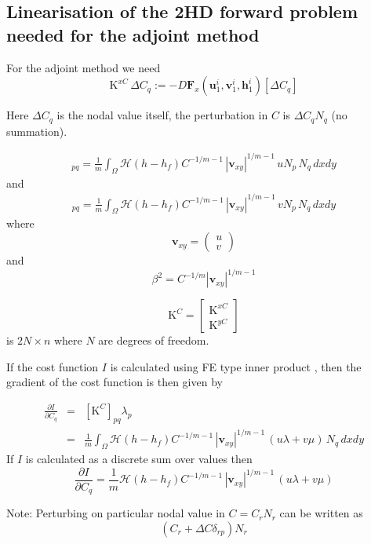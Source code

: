 \documentclass[10pt,a4paper]{book}
\newcommand{\He}{\mathcal{H}}
\newcommand{\p}{\partial}
\begin{document}
\subsection{Linearisation of the 2HD forward problem needed for the adjoint method}

For the adjoint method we need	
\[
\mathrm{K}^{xC} \, \Delta C_q:=-D \bm{F}_x(\bm{u}_1^{i},\bm{v}_1^i,\bm{h}_1^i)[\Delta C_q]
\]

Here $\Delta C_q$ is the nodal value itself, the perturbation in $C$ is $\Delta C_q N_q$ (no summation).

\begin{eqnarray}
[\mathrm{K}^{xC}]_{pq}=\frac{1}{m} \int_{\Omega}  \He(h-h_f)  C^{-1/m-1}  \, | \bm{v}_{xy}|^{1/m-1} \,  u N_p \, N_q \, dx dy 
\end{eqnarray}
and
\begin{eqnarray}
[\mathrm{K}^{yC}]_{pq}=\frac{1}{m} \int_{\Omega}  \He(h-h_f)  C^{-1/m-1}  \, | \bm{v}_{xy}|^{1/m-1} \,  v N_p \, N_q \, dx dy 
\end{eqnarray}
where
\[
\bm{v}_{xy}= \left ( \begin{array}{c} u \\ v \end{array} \right )
\]
and
\[
\beta^2=C^{-1/m} | \bm{v}_{xy}|^{1/m-1} 
\]

\[
\mathrm{K}^{C}=\left [ \begin{array}{c}  \mathrm{K}^{xC} \\ \mathrm{K}^{yC} \end{array} \right ] 
\]
is $2N \times n$ where $N$ are degrees of freedom.

If the cost function $I$ is calculated using FE type inner product , then the gradient of the cost function is then given by

\begin{eqnarray*}
\frac{\p I}{\p C_q} &=& [\mathrm{K}^{C}]_{pq} \lambda_p \\
                    &=& \frac{1}{m} \int_{\Omega}  \He(h-h_f)  C^{-1/m-1}  \, | \bm{v}_{xy}|^{1/m-1} \,  (u \lambda +v \mu ) \, N_q \, dx dy 
\end{eqnarray*}
If $I$ is calculated as a discrete sum over values then
\[
\frac{\p I}{\p C_q}=\frac{1}{m}  \He(h-h_f)  C^{-1/m-1}  \, | \bm{v}_{xy}|^{1/m-1} \,  (u \lambda +v \mu ) 
\]


Note: Perturbing on particular nodal value in $C=C_r N_r$ can be written as
\[
(C_r+\Delta C \delta_{rp}) N_r
\]
\end{document}
